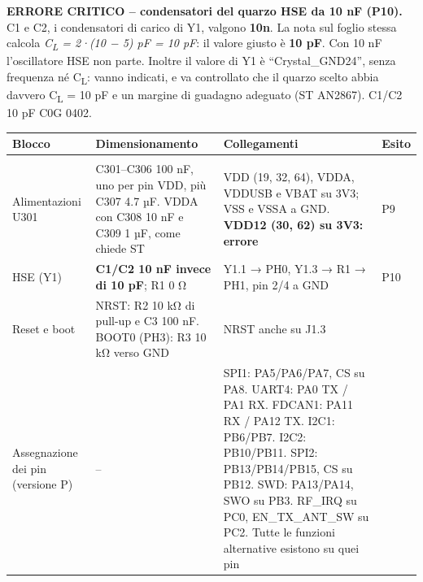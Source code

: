 \begin{critbox}
\textbf{ERRORE CRITICO – condensatori del quarzo HSE da 10 nF (P10).} C1 e C2, i condensatori di carico di Y1, valgono \textbf{10n}. La nota sul foglio stessa calcola \textit{C\textsubscript{L} = 2·(10 − 5) pF = 10 pF}: il valore giusto è \textbf{10 pF}. Con 10 nF l'oscillatore HSE non parte. Inoltre il valore di Y1 è \textquotedblleft{}Crystal\_\allowbreak{}GND24\textquotedblright{}, senza frequenza né C\textsubscript{L}: vanno indicati, e va controllato che il quarzo scelto abbia davvero C\textsubscript{L} = 10 pF e un margine di guadagno adeguato (ST AN2867). C1/\allowbreak{}C2 10 pF C0G 0402.
\end{critbox}

{\footnotesize{}\setlength{\tabcolsep}{4pt}\renewcommand{\arraystretch}{1.1}
\begin{xltabular}{\linewidth}{>{\hsize\raggedright\arraybackslash}X>{\hsize\raggedright\arraybackslash}X>{\hsize\raggedright\arraybackslash}X>{\hsize\raggedright\arraybackslash}X}
\toprule
\textbf{Blocco} & \textbf{Dimensionamento} & \textbf{Collegamenti} & \textbf{Esito} \\
\midrule
\endhead
\midrule[0.15pt]\\\bottomrule\endfoot
\bottomrule\endlastfoot
Alimentazioni U301 & C301–C306 100 nF, uno per pin VDD, più C307 4.7 µF. VDDA con C308 10 nF e C309 1 µF, come chiede ST & VDD (19, 32, 64), VDDA, VDDUSB e VBAT su 3V3; VSS e VSSA a GND. \textbf{VDD12 (30, 62) su 3V3: errore} &  P9 \\\midrule[0.15pt]
HSE (Y1) & \textbf{C1/\allowbreak{}C2 10 nF invece di 10 pF}; R1 0 Ω & Y1.1 → PH0, Y1.3 → R1 → PH1, pin 2/\allowbreak{}4 a GND &  P10 \\\midrule[0.15pt]
Reset e boot & NRST: R2 10 kΩ di pull-up e C3 100 nF. BOOT0 (PH3): R3 10 kΩ verso GND & NRST anche su J1.3 &  \\\midrule[0.15pt]
Assegnazione dei pin (versione P) & – & SPI1: PA5/\allowbreak{}PA6/\allowbreak{}PA7, CS su PA8. UART4: PA0 TX /\allowbreak{} PA1 RX. FDCAN1: PA11 RX /\allowbreak{} PA12 TX. I2C1: PB6/\allowbreak{}PB7. I2C2: PB10/\allowbreak{}PB11. SPI2: PB13/\allowbreak{}PB14/\allowbreak{}PB15, CS su PB12. SWD: PA13/\allowbreak{}PA14, SWO su PB3. RF\_\allowbreak{}IRQ su PC0, EN\_\allowbreak{}TX\_\allowbreak{}ANT\_\allowbreak{}SW su PC2. Tutte le funzioni alternative esistono su quei pin &  \\\midrule[0.15pt]

\end{xltabular}}
